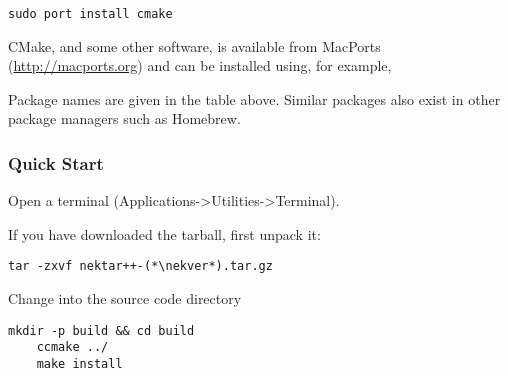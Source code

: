 \newsavebox\installationOSXMacPortsTip
\begin{lrbox}{\installationOSXMacPortsTip}\begin{minipage}{0.8\linewidth}
\begin{lstlisting}[style=BashInputStyle]
sudo port install cmake
\end{lstlisting}
\end{minipage}
\end{lrbox}

\begin{tipbox}
CMake, and some other software, is available from MacPorts
(\url{http://macports.org}) and can be installed using, for example,

\noindent\usebox\installationOSXMacPortsTip

Package names are given in the table above. Similar packages also exist in other
package managers such as Homebrew.
\end{tipbox}


\subsubsection{Quick Start}
Open a terminal (Applications->Utilities->Terminal).

If you have downloaded the tarball, first unpack it:
\begin{lstlisting}[style=BashInputStyle]
tar -zxvf nektar++-(*\nekver*).tar.gz
\end{lstlisting}
Change into the  source code directory
\begin{lstlisting}[style=BashInputStyle]
    mkdir -p build && cd build
    ccmake ../
    make install
\end{lstlisting}

